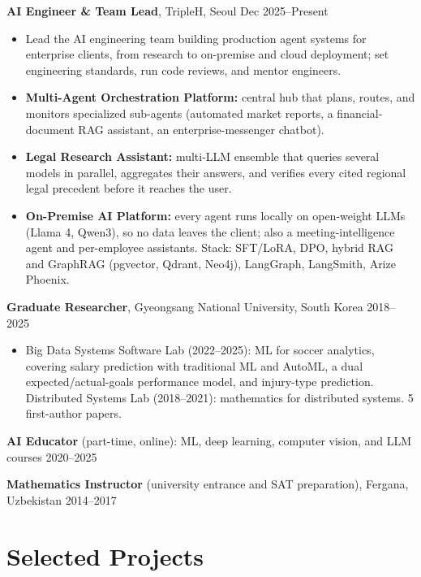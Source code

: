 \documentclass[10pt,a4paper]{article}
\newcommand{\group}[1]{\vspace{2pt}{\normalsize\bfseries\itshape #1}\par\vspace{2pt}}
\begin{document}
\textbf{AI Engineer \& Team Lead}, TripleH, Seoul \hfill Dec 2025--Present
\begin{itemize}
    \item Lead the AI engineering team building production agent systems for enterprise clients, from research to on-premise
and cloud deployment; set engineering standards, run code reviews, and mentor engineers.
    \item \textbf{Multi-Agent Orchestration Platform:} central hub that plans, routes, and monitors specialized sub-agents
(automated market reports, a financial-document RAG assistant, an enterprise-messenger chatbot).
    \item \textbf{Legal Research Assistant:} multi-LLM ensemble that queries several models in parallel, aggregates their
answers, and verifies every cited regional legal precedent before it reaches the user.
    \item \textbf{On-Premise AI Platform:} every agent runs locally on open-weight LLMs (Llama 4, Qwen3), so no data leaves the
client; also a meeting-intelligence agent and per-employee assistants. Stack: SFT/LoRA, DPO, hybrid RAG and GraphRAG
(pgvector, Qdrant, Neo4j), LangGraph, LangSmith, Arize Phoenix.
\end{itemize}

\textbf{Graduate Researcher}, Gyeongsang National University, South Korea \hfill 2018--2025
\begin{itemize}
    \item Big Data Systems Software Lab (2022--2025): ML for soccer analytics, covering salary prediction with traditional ML and
AutoML, a dual expected/actual-goals performance model, and injury-type prediction. Distributed Systems Lab
(2018--2021): mathematics for distributed systems. 5 first-author papers.
\end{itemize}

\textbf{AI Educator} (part-time, online): ML, deep learning, computer vision, and LLM courses \hfill 2020--2025

\textbf{Mathematics Instructor} (university entrance and SAT preparation), Fergana, Uzbekistan \hfill 2014--2017

\section*{Selected Projects}

\group{LLM \& Agentic Systems}
\end{document}
